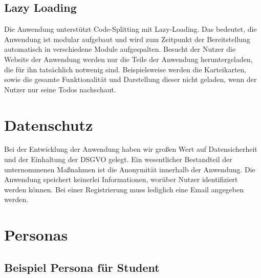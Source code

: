 \subsection{Lazy Loading}
Die Anwendung unterstützt Code-Splitting mit Lazy-Loading.
Das bedeutet, die Anwendung ist modular aufgebaut und wird zum Zeitpunkt der Bereitstellung automatisch in verschiedene Module aufgespalten.
Besucht der Nutzer die Website der Anwendung werden nur die Teile der Anwendung heruntergeladen, die für ihn tatsächlich notwenig sind.
Beispielsweise werden die Karteikarten, sowie die gesamte Funktionalität und Darstellung dieser nicht geladen, wenn der Nutzer nur seine Todos nachschaut.


\section{Datenschutz}
Bei der Entwicklung der Anwendung haben wir großen Wert auf Datensicherheit und der Einhaltung der DSGVO gelegt.
Ein wesentlicher Bestandteil der unternommenen Maßnahmen ist die Anonymität innerhalb der Anwendung.
Die Anwendung speichert keinerlei Informationen, worüber Nutzer identifiziert werden können.
Bei einer Registrierung muss lediglich eine Email angegeben werden.





\section{Personas}



\subsection{Beispiel Persona für Student}

